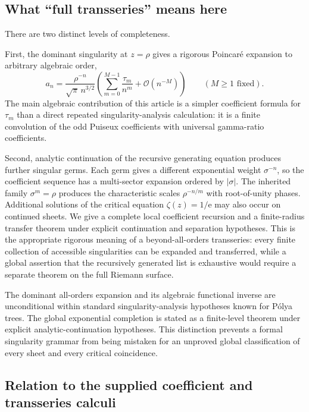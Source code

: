 \documentclass[11pt,oneside]{article}
\numberwithin{equation}{section}
\theoremstyle{plain}
\theoremstyle{definition}
\theoremstyle{remark}
\newcommand{\e}{\mathrm e}
\newcommand{\Ord}{\mathcal O}
\begin{document}
\subsection{What ``full transseries'' means here}

There are two distinct levels of completeness.

First, the dominant singularity at $z=\rho$ gives a rigorous Poincar\'e
expansion to arbitrary algebraic order,
\[
 a_n=\frac{\rho^{-n}}{\sqrt\pi\,n^{3/2}}
 \left(\sum_{m=0}^{M-1}\frac{\tau_m}{n^m}
       +\Ord(n^{-M})\right)
 \qquad(M\ge1\text{ fixed}).
\]
The main algebraic contribution of this article is a simpler coefficient
formula for $\tau_m$ than a direct repeated singularity-analysis calculation:
it is a finite convolution of the odd Puiseux coefficients with universal
gamma-ratio coefficients.

Second, analytic continuation of the recursive generating equation produces
further singular germs.  Each germ gives a different exponential weight
$\sigma^{-n}$, so the coefficient sequence has a multi-sector expansion
ordered by $|\sigma|$.  The inherited family
$\sigma^m=\rho$ produces the characteristic scales
$\rho^{-n/m}$ with root-of-unity phases.  Additional solutions of the
critical equation $\zeta(z)=1/\e$ may also occur on continued sheets.  We
give a complete local coefficient recursion and a finite-radius transfer
theorem under explicit continuation and separation hypotheses.  This is the
appropriate rigorous meaning of a beyond-all-orders transseries: every
finite collection of accessible singularities can be expanded and
transferred, while a global assertion that the recursively generated list is
exhaustive would require a separate theorem on the full Riemann surface.

\begin{warningbox}
The dominant all-orders expansion and its algebraic functional inverse are
unconditional within standard singularity-analysis hypotheses known for
P\'olya trees.  The global exponential completion is stated as a finite-level
theorem under explicit analytic-continuation hypotheses.  This distinction
prevents a formal singularity grammar from being mistaken for an unproved
global classification of every sheet and every critical coincidence.
\end{warningbox}

\subsection{Relation to the supplied coefficient and transseries calculi}
\end{document}
